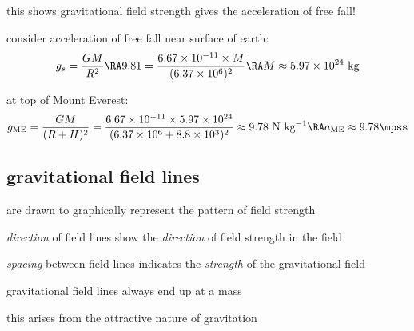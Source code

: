 this shows gravitational field strength gives the acceleration of free fall!


\sol consider acceleration of free fall near surface of earth:
\begin{equation*}
	g_s = \frac{GM}{R^2} \RA 9.81 = \frac{6.67\times10^{-11}\times M}{(6.37\times10^6)^2} \RA M \approx 5.97\times10^{24} \text{ kg}
\end{equation*}

at top of Mount Everest:
\begin{equation*}
g_\text{ME} = \frac{GM}{(R+H)^2} = \frac{6.67\times10^{-11}\times 5.97\times10^{24}}{(6.37\times10^6+8.8\times10^3)^2} \approx 9.78 \text{ N kg}^{-1} \RA a_\text{ME} \approx 9.78 \mpss 
\end{equation*}



\subsection{gravitational field lines}
 are drawn to graphically represent the pattern of field strength

\cmt \emph{direction} of field lines show the \emph{direction} of field strength in the field
	
\cmt \emph{spacing} between field lines indicates the \emph{strength} of the gravitational field
	
\cmt gravitational field lines always end up at a mass

     this arises from the attractive nature of gravitation

